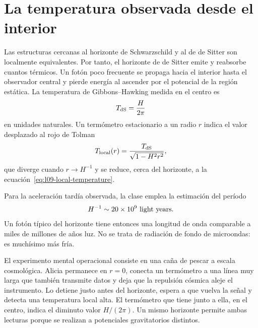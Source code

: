 \begin{classroomqa}
\end{classroomqa}

\section{La temperatura observada desde el interior}

Las estructuras cercanas al horizonte de Schwarzschild y al de de Sitter son localmente equivalentes. Por tanto, el horizonte de de Sitter emite y reabsorbe cuantos térmicos. Un fotón poco frecuente se propaga hacia el interior hasta el observador central y pierde energía al ascender por el potencial de la región estática. La temperatura de Gibbons--Hawking medida en el centro es
\begin{equation}
T_{\rm dS}=\frac{H}{2\pi}
\label{eq:l09-de-sitter-temperature}
\end{equation}
en unidades naturales. Un termómetro estacionario a un radio \(r\) indica el valor desplazado al rojo de Tolman
\begin{equation}
T_{\rm local}(r)=
\frac{T_{\rm dS}}{\sqrt{1-H^2r^2}},
\label{eq:l09-tolman}
\end{equation}
que diverge cuando \(r\to H^{-1}\) y se reduce, cerca del horizonte, a la ecuación~\eqref{eq:l09-local-temperature}.


Para la aceleración tardía observada, la clase emplea la estimación del período
\begin{equation}
H^{-1}\sim 20\times10^9\ {\rm light\ years}.
\label{eq:l09-lecture-horizon-estimate}
\end{equation}
Un fotón típico del horizonte tiene entonces una longitud de onda comparable a miles de millones de años luz. No se trata de radiación de fondo de microondas: es muchísimo más fría.

El experimento mental operacional consiste en una caña de pescar a escala cosmológica. Alicia permanece en \(r=0\), conecta un termómetro a una línea muy larga que también transmite datos y deja que la repulsión cósmica aleje el instrumento. Lo detiene justo antes del horizonte, espera a que vuelva la señal y detecta una temperatura local alta. El termómetro que tiene junto a ella, en el centro, indica el diminuto valor \(H/(2\pi)\). Un mismo horizonte permite ambas lecturas porque se realizan a potenciales gravitatorios distintos.

